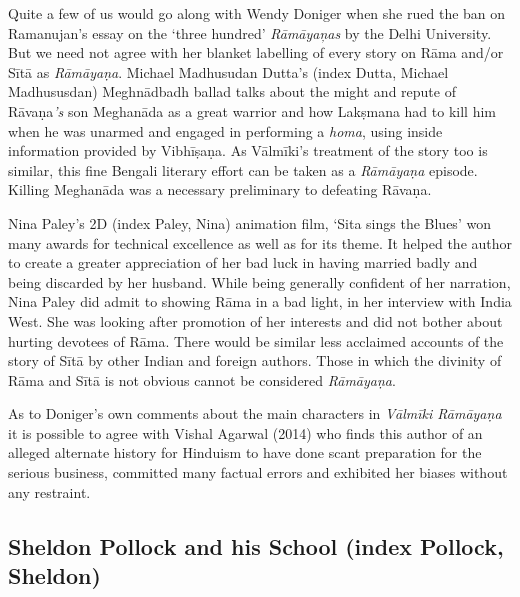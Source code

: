 \item Quite a few of us would go along with Wendy Doniger when she rued the ban on Ramanujan’s essay on the ‘three hundred’ \textit{Rāmāyaņas} by the Delhi University. But we need not agree with her blanket labelling of every story on Rāma and/or Sītā as \textit{Rāmāyaṇa}. Michael Madhusudan Dutta’s (index Dutta, Michael Madhususdan) Meghnādbadh ballad talks about the might and repute of Rāvaṇa\textit{'s} son Meghanāda as a great warrior and how Lakṣmana had to kill him when he was unarmed and engaged in performing a \textit{homa}, using inside information provided by Vibhīṣaṇa. As Vālmīki’s treatment of the story too is similar, this fine Bengali literary effort can be taken as a \textit{Rāmāyaṇa} episode. Killing Meghanāda was a necessary preliminary to defeating Rāvaṇa.

 \item Nina Paley’s 2D (index Paley, Nina) animation film, ‘Sita sings the Blues’ won many awards for technical excellence as well as for its theme. It helped the author to create a greater appreciation of her bad luck in having married badly and being discarded by her husband. While being generally confident of her narration, Nina Paley did admit to showing Rāma in a bad light, in her interview with India West. She was looking after promotion of her interests and did not bother about hurting devotees of Rāma. There would be similar less acclaimed accounts of the story of Sītā by other Indian and foreign authors. Those in which the divinity of Rāma and Sītā is not obvious cannot be considered \textit{Rāmāyaṇa}.

 \item As to Doniger’s own comments about the main characters in \textit{Vālmīki Rāmāyaṇa} it is possible to agree with Vishal Agarwal (2014) who finds this author of an alleged alternate history for Hinduism to have done scant preparation for the serious business, committed many factual errors and exhibited her biases without any restraint.



\subsection{Sheldon Pollock and his School (index Pollock, Sheldon)}

